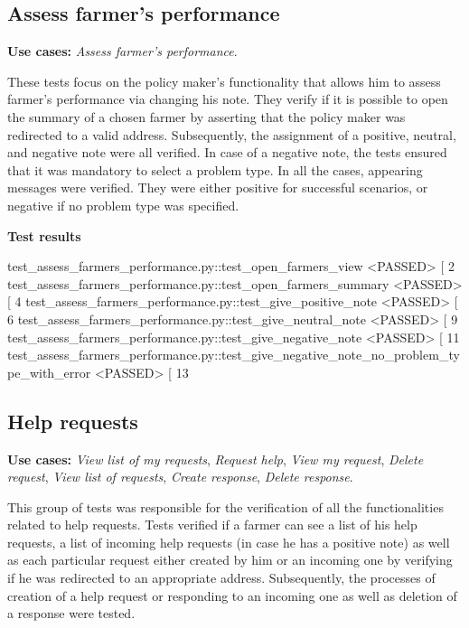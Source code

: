 \subsection{Assess farmer's performance}

\textbf{Use cases:} \textit{Assess farmer's performance}.

These tests focus on the policy maker's functionality that allows him to assess farmer's performance via changing his note. They verify if it is possible to open the summary of a chosen farmer by asserting that the policy maker was redirected to a valid address. Subsequently, the assignment of a positive, neutral, and negative note were all verified. In case of a negative note, the tests ensured that it was mandatory to select a problem type. In all the cases, appearing messages were verified. They were either positive for successful scenarios, or negative if no problem type was specified.

\textbf{Test results}
\begin{verbnobox}[\scriptsize \vbdelim]
test_assess_farmers_performance.py::test_open_farmers_view <PASSED>                             [  2%
test_assess_farmers_performance.py::test_open_farmers_summary <PASSED>                          [  4%
test_assess_farmers_performance.py::test_give_positive_note <PASSED>                            [  6%
test_assess_farmers_performance.py::test_give_neutral_note <PASSED>                             [  9%
test_assess_farmers_performance.py::test_give_negative_note <PASSED>                            [ 11%
test_assess_farmers_performance.py::test_give_negative_note_no_problem_type_with_error <PASSED> [ 13%
\end{verbnobox}

\subsection{Help requests}

\textbf{Use cases:} \textit{View list of my requests}, \textit{Request help}, \textit{View my request}, \textit{Delete request}, \textit{View list of requests}, \textit{Create response}, \textit{Delete response}.

This group of tests was responsible for the verification of all the functionalities related to help requests. Tests verified if a farmer can see a list of his help requests, a list of incoming help requests (in case he has a positive note) as well as each particular request either created by him or an incoming one by verifying if he was redirected to an appropriate address. Subsequently, the processes of creation of a help request or responding to an incoming one as well as deletion of a response were tested.

